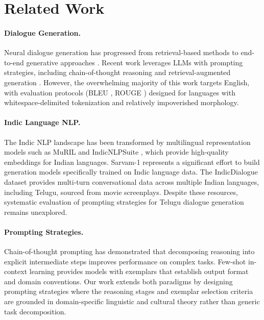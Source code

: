 \documentclass[11pt]{article}
\begin{document}
\section{Related Work}
\label{sec:related}

\paragraph{Dialogue Generation.}
Neural dialogue generation has progressed from retrieval-based methods to end-to-end generative approaches \citep{zhang-etal-2019-dialogpt, li-etal-2016-diversity}. Recent work leverages LLMs with prompting strategies, including chain-of-thought reasoning \citep{wei-etal-2022-chain} and retrieval-augmented generation \citep{lewis-etal-2020-retrieval}. However, the overwhelming majority of this work targets English, with evaluation protocols (BLEU \citep{papineni-etal-2002-bleu}, ROUGE \citep{lin-2004-rouge}) designed for languages with whitespace-delimited tokenization and relatively impoverished morphology.

\paragraph{Indic Language NLP.}
The Indic NLP landscape has been transformed by multilingual representation models such as MuRIL \citep{khanuja-etal-2021-muril} and IndicNLPSuite \citep{kakwani-etal-2020-indicnlpsuite}, which provide high-quality embeddings for Indian languages. Sarvam-1 \citep{sarvam-ai-2024} represents a significant effort to build generation models specifically trained on Indic language data. The IndicDialogue dataset \citep{bharadwaj-etal-2023-indicdialogue} provides multi-turn conversational data across multiple Indian languages, including Telugu, sourced from movie screenplays. Despite these resources, systematic evaluation of prompting strategies for Telugu dialogue generation remains unexplored.

\paragraph{Prompting Strategies.}
Chain-of-thought prompting \citep{wei-etal-2022-chain} has demonstrated that decomposing reasoning into explicit intermediate steps improves performance on complex tasks. Few-shot in-context learning \citep{brown-etal-2020-language} provides models with exemplars that establish output format and domain conventions. Our work extends both paradigms by designing prompting strategies where the reasoning stages and exemplar selection criteria are grounded in domain-specific linguistic and cultural theory rather than generic task decomposition.
\end{document}
